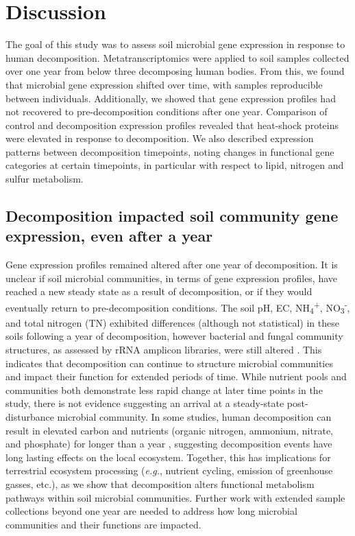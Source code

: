 \documentclass[
  sn-nature,
  lineno, referee]{sn-jnl}
\begin{document}
\section{Discussion}\label{discussion}

The goal of this study was to assess soil microbial gene expression in
response to human decomposition. Metatranscriptomics were applied to
soil samples collected over one year from below three decomposing human
bodies. From this, we found that microbial gene expression shifted over
time, with samples reproducible between individuals. Additionally, we
showed that gene expression profiles had not recovered to
pre-decomposition conditions after one year. Comparison of control and
decomposition expression profiles revealed that heat-shock proteins were
elevated in response to decomposition. We also described expression
patterns between decomposition timepoints, noting changes in functional
gene categories at certain timepoints, in particular with respect to
lipid, nitrogen and sulfur metabolism.

\subsection{Decomposition impacted soil community gene expression, even
after a
year}\label{decomposition-impacted-soil-community-gene-expression-even-after-a-year}

Gene expression profiles remained altered after one year of
decomposition. It is unclear if soil microbial communities, in terms of
gene expression profiles, have reached a new steady state as a result of
decomposition, or if they would eventually return to pre-decomposition
conditions. The soil pH, EC, NH\textsubscript{4}\textsuperscript{+},
NO\textsubscript{3}\textsuperscript{-}, and total nitrogen (TN)
exhibited differences (although not statistical) in these soils
following a year of decomposition, however bacterial and fungal
community structures, as assessed by rRNA amplicon libraries, were still
altered \citep{taylor_transient_2024}. This indicates that decomposition
can continue to structure microbial communities and impact their
function for extended periods of time. While nutrient pools and
communities both demonstrate less rapid change at later time points in
the study, there is not evidence suggesting an arrival at a steady-state
post-disturbance microbial community. In some studies, human
decomposition can result in elevated carbon and nutrients (organic
nitrogen, ammonium, nitrate, and phosphate) for longer than a year
\citep{debruyn_carrion_2024}, suggesting decomposition events have long
lasting effects on the local ecosystem. Together, this has implications
for terrestrial ecosystem processing (\emph{e.g.}, nutrient cycling,
emission of greenhouse gasses, etc.), as we show that decomposition
alters functional metabolism pathways within soil microbial communities.
Further work with extended sample collections beyond one year are needed
to address how long microbial communities and their functions are
impacted.
\end{document}
